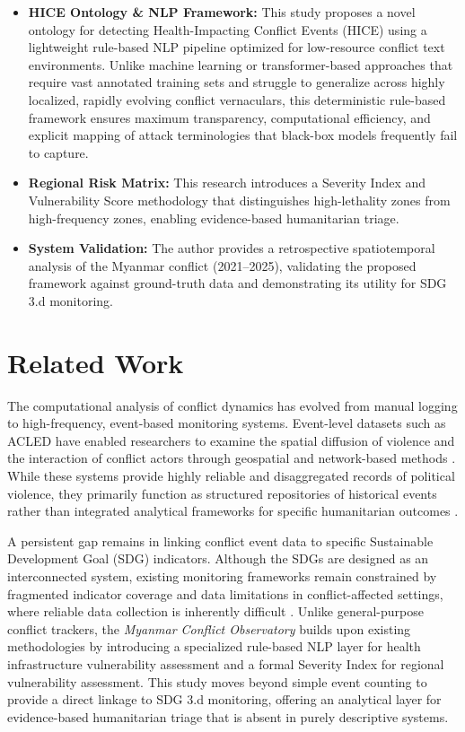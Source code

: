 \documentclass[conference]{IEEEtran}
\begin{document}
\begin{itemize}
    \item \textbf{HICE Ontology \& NLP Framework:} This study proposes a novel ontology for detecting Health-Impacting Conflict Events (HICE) using a lightweight rule-based NLP pipeline optimized for low-resource conflict text environments. Unlike machine learning or transformer-based approaches that require vast annotated training sets and struggle to generalize across highly localized, rapidly evolving conflict vernaculars, this deterministic rule-based framework ensures maximum transparency, computational efficiency, and explicit mapping of attack terminologies that black-box models frequently fail to capture.
    \item \textbf{Regional Risk Matrix:} This research introduces a Severity Index and Vulnerability Score methodology that distinguishes high-lethality zones from high-frequency zones, enabling evidence-based humanitarian triage.
    \item \textbf{System Validation:} The author provides a retrospective spatiotemporal analysis of the Myanmar conflict (2021–2025), validating the proposed framework against ground-truth data and demonstrating its utility for SDG 3.d monitoring.
\end{itemize}

\section{Related Work}

The computational analysis of conflict dynamics has evolved from manual logging to high-frequency, event-based monitoring systems. Event-level datasets such as ACLED have enabled researchers to examine the spatial diffusion of violence and the interaction of conflict actors through geospatial and network-based methods \cite{schutte2011violence,idler2023conflict}. While these systems provide highly reliable and disaggregated records of political violence, they primarily function as structured repositories of historical events rather than integrated analytical frameworks for specific humanitarian outcomes \cite{raleigh2010introducing}.

A persistent gap remains in linking conflict event data to specific Sustainable Development Goal (SDG) indicators. Although the SDGs are designed as an interconnected system, existing monitoring frameworks remain constrained by fragmented indicator coverage and data limitations in conflict-affected settings, where reliable data collection is inherently difficult \cite{un2023sdg}. Unlike general-purpose conflict trackers, the \textit{Myanmar Conflict Observatory} builds upon existing methodologies by introducing a specialized rule-based NLP layer for health infrastructure vulnerability assessment and a formal Severity Index for regional vulnerability assessment. This study moves beyond simple event counting to provide a direct linkage to SDG 3.d monitoring, offering an analytical layer for evidence-based humanitarian triage that is absent in purely descriptive systems.
\end{document}
